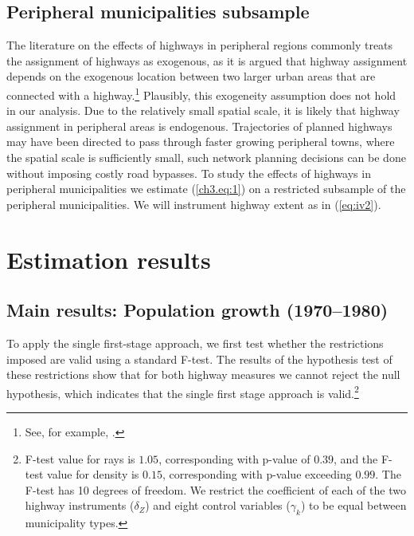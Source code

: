 \documentclass[a4paper,authoryear,review]{elsarticle}  	%
\begin{document}
\subsection{Peripheral municipalities subsample}		
	The literature on the effects of highways in peripheral regions commonly treats the assignment of highways as exogenous, as it is argued that highway assignment depends on the exogenous location between two larger urban areas that are connected with a highway.\footnote{See, for example, \citet{Chandra2000,Fajgelbaum2014,Michaels2008}.} Plausibly, this exogeneity assumption does not hold in our analysis. Due to the relatively small spatial scale, it is likely that highway assignment in peripheral areas is endogenous. Trajectories of planned highways may have been directed to pass through faster growing peripheral towns, where the spatial scale is sufficiently small, such network planning decisions can be done without imposing costly road bypasses. To study the effects of highways in peripheral municipalities we estimate (\ref{ch3.eq:1}) on a restricted subsample of the peripheral municipalities. We will instrument highway extent as in (\ref{eq:iv2}). %


\section{Estimation results}
\subsection{Main results: Population growth (1970--1980)}
	To apply the single first-stage approach, we first test whether the restrictions imposed are valid using a standard F-test. The results of the hypothesis test of these restrictions show that for both highway measures we cannot reject the null hypothesis, which indicates that the single first stage approach is valid.\footnote{F-test value for rays is $1.05$, corresponding with p-value of $0.39$, and the F-test value for density is $0.15$, corresponding with p-value exceeding $0.99$. The F-test has 10 degrees of freedom. We restrict the coefficient of each of the two highway instruments ($\delta_Z$) and eight control variables ($\gamma_k$) to be equal between municipality types.}
	
\end{document}
